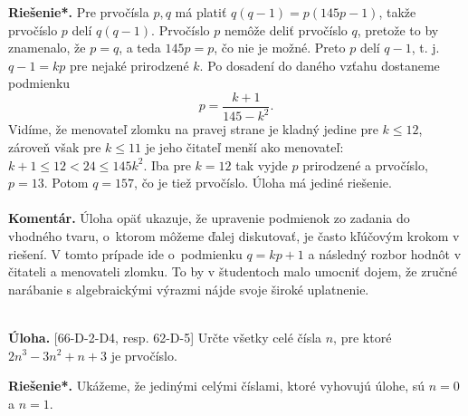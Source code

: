 \documentclass[11pt,a4paper,oneside,final]{book}
\newcommand{\kom}{\textbf{Komentár.} }
\newcommand{\ul}{\textbf{Úloha.} }
\newcommand{\rieh}{\textbf{Riešenie*.} }
\begin{document}
\rieh Pre prvočísla $p, q$ má platiť $q(q - 1) = p(145p -1)$, takže prvočíslo $p$ delí $q(q -1)$. Prvočíslo $p$ nemôže deliť prvočíslo $q$, pretože to by znamenalo, že $p = q$, a teda $145p = p$, čo nie je možné. Preto $p$ delí $q-1$, t. j. $q - 1 = kp$ pre nejaké prirodzené $k$. Po dosadení do daného vzťahu dostaneme podmienku $$p=\frac{k+1}{145-k^2}.$$ Vidíme, že menovateľ zlomku na pravej strane je kladný jedine pre $k \leq 12$, zároveň však pre $k \leq 11$ je jeho čitateľ menší ako menovateľ: $k + 1 \leq 12 < 24 \leq 145 k^2$. Iba pre $k = 12$ tak vyjde $p$ prirodzené a prvočíslo, $p = 13$. Potom $q = 157$, čo je tiež prvočíslo. Úloha má jediné riešenie.\\
\\
\kom Úloha opäť ukazuje, že upravenie podmienok zo zadania do vhodného tvaru, o~ktorom môžeme ďalej diskutovať, je často kľúčovým krokom v riešení. V tomto prípade ide o~podmienku $q=kp+1$ a následný rozbor hodnôt v čitateli a menovateli zlomku. To by v študentoch malo umocniť dojem, že zručné narábanie s algebraickými výrazmi nájde svoje široké uplatnenie.\\
\\
\begin{tcolorbox}[breakable,notitle,boxrule=0pt,colback=light-gray,colframe=light-gray]\ul [66-D-2-D4, resp. 62-D-5]
Určte všetky celé čísla $n$, pre ktoré $2n^3 -3n^2 +n+3$ je prvočíslo.

\end{tcolorbox}

\rieh Ukážeme, že jedinými celými číslami, ktoré vyhovujú úlohe, sú $n = 0$ a $n = 1$.
\end{document}
